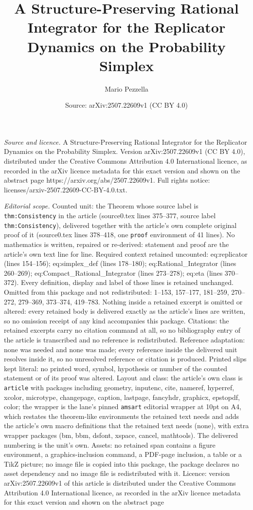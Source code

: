 \documentclass[10pt,a4paper]{amsart}
\title[A Structure-Preserving Rational Integrator for the Replicato]{A Structure-Preserving Rational Integrator for the Replicator Dynamics on the Probability Simplex}
\author{Mario Pezzella}
\date{Source: arXiv:2507.22609v1 (CC BY 4.0)}
\begin{document}
\maketitle

\noindent\emph{Source and licence.} A Structure-Preserving Rational Integrator for the Replicator Dynamics on the Probability Simplex. Version arXiv:2507.22609v1 (CC BY 4.0), distributed under the Creative Commons Attribution 4.0 International licence, as recorded in the arXiv licence metadata for this exact version and shown on the abstract page https://arxiv.org/abs/2507.22609v1. Full rights notice: licenses/arxiv-2507.22609-CC-BY-4.0.txt.\par\smallskip

\noindent\textit{Editorial scope.} Counted unit: the Theorem whose source label is \texttt{thm:Consistency} in the article (source0.tex lines 375--377, source label \texttt{thm:Consistency}), delivered together with the article's own complete original proof of it (source0.tex lines 378--418, one \texttt{proof} environment of 41 lines). No mathematics is written, repaired or re-derived: statement and proof are the article's own text line for line. Required context retained uncounted: eq:replicator (lines 154--156); eq:simplex\_def (lines 178--180); eq:Rational\_Integrator (lines 260--269); eq:Compact\_Rational\_Integrator (lines 273--278); eq:eta (lines 370--372). Every definition, display and label of those lines is retained unchanged. Omitted from this package and not redistributed: 1--153, 157--177, 181--259, 270--272, 279--369, 373--374, 419--783. Nothing inside a retained excerpt is omitted or altered: every retained body is delivered exactly as the article's lines are written, so no omission receipt of any kind accompanies this package. Citations: the retained excerpts carry no citation command at all, so no bibliography entry of the article is transcribed and no reference is redistributed. Reference adaptation: none was needed and none was made; every reference inside the delivered unit resolves inside it, so no unresolved reference or citation is produced. Printed slips kept literal: no printed word, symbol, hypothesis or number of the counted statement or of its proof was altered. Layout and class: the article's own class is \texttt{article} with packages including geometry, inputenc, cite, nameref, hyperref, xcolor, microtype, changepage, caption, lastpage, fancyhdr, graphicx, epstopdf, color; the wrapper is the lane's pinned \texttt{amsart} editorial wrapper at 10pt on A4, which restates the theorem-like environments the retained text needs and adds the article's own macro definitions that the retained text needs (none), with extra wrapper packages (bm, bbm, dsfont, xspace, cancel, mathtools). The delivered numbering is the unit's own. Assets: no retained span contains a figure environment, a graphics-inclusion command, a PDF-page inclusion, a table or a TikZ picture; no image file is copied into this package, the package declares no asset dependency and no image file is redistributed with it. Licence: version arXiv:2507.22609v1 of this article is distributed under the Creative Commons Attribution 4.0 International licence, as recorded in the arXiv licence metadata for this exact version and shown on the abstract page 
\end{document}

